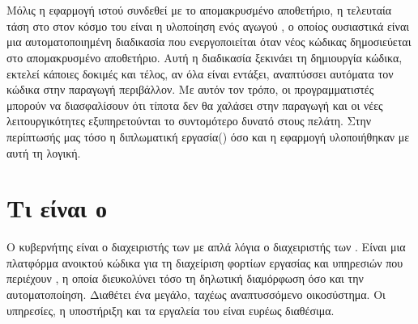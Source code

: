\section{ }
Μόλις η εφαρμογή ιστού συνδεθεί με το απομακρυσμένο αποθετήριο, η τελευταία τάση στο
στον κόσμο του  είναι η υλοποίηση ενός αγωγού , ο οποίος ουσιαστικά
είναι μια αυτοματοποιημένη διαδικασία που ενεργοποιείται όταν νέος κώδικας δημοσιεύεται στο
απομακρυσμένο αποθετήριο. Αυτή η διαδικασία ξεκινάει τη δημιουργία κώδικα, εκτελεί κάποιες δοκιμές και
τέλος, αν όλα είναι εντάξει, αναπτύσσει αυτόματα τον κώδικα στην παραγωγή
περιβάλλον. Με αυτόν τον τρόπο, οι προγραμματιστές μπορούν να διασφαλίσουν ότι τίποτα δεν θα χαλάσει
στην παραγωγή και οι νέες λειτουργικότητες εξυπηρετούνται το συντομότερο δυνατό στους
πελάτη. Στην περίπτωσής μας τόσο η διπλωματική εργασία() όσο και η εφαρμογή υλοποιήθηκαν με αυτή τη λογική.


\section{Τι είναι ο  }
Ο κυβερνήτης είναι ο διαχειριστής των με απλά λόγια ο διαχειριστής των . Είναι μια 
πλατφόρμα ανοικτού κώδικα για τη διαχείριση φορτίων εργασίας και υπηρεσιών που περιέχουν 
, η οποία διευκολύνει τόσο τη δηλωτική διαμόρφωση όσο και την αυτοματοποίηση. 
Διαθέτει ένα μεγάλο, ταχέως αναπτυσσόμενο οικοσύστημα. Οι υπηρεσίες, η υποστήριξη και τα εργαλεία του  είναι ευρέως διαθέσιμα.






